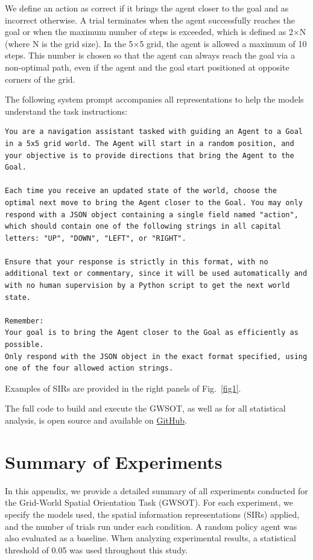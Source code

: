\documentclass[runningheads]{llncs}
\begin{document}
We define an action as correct if it brings the agent closer to the goal and as incorrect otherwise. A trial terminates when the agent successfully reaches the goal or when the maximum number of steps is exceeded, which is defined as 2×N (where N is the grid size). In the 5×5 grid, the agent is allowed a maximum of 10 steps. This number is chosen so that the agent can always reach the goal via a non-optimal path, even if the agent and the goal start positioned at opposite corners of the grid.

The following system prompt accompanies all representations to help the models understand the task instructions: 

\begin{lstlisting}[basicstyle=\ttfamily\small, breaklines=true, frame=single]
You are a navigation assistant tasked with guiding an Agent to a Goal in a 5x5 grid world. The Agent will start in a random position, and your objective is to provide directions that bring the Agent to the Goal.

Each time you receive an updated state of the world, choose the optimal next move to bring the Agent closer to the Goal. You may only respond with a JSON object containing a single field named "action", which should contain one of the following strings in all capital letters: "UP", "DOWN", "LEFT", or "RIGHT".

Ensure that your response is strictly in this format, with no additional text or commentary, since it will be used automatically and with no human supervision by a Python script to get the next world state.

Remember:
Your goal is to bring the Agent closer to the Goal as efficiently as possible.
Only respond with the JSON object in the exact format specified, using one of the four allowed action strings.
\end{lstlisting}

Examples of SIRs are provided in the right panels of Fig.~\ref{fig1}.

The full code to build and execute the GWSOT, as well as for all statistical analysis, is open source and available on \href{https://github.com/mneuronico/Griw-World-Spatial-Orientation-Task}{GitHub}.

\section{Summary of Experiments}

In this appendix, we provide a detailed summary of all experiments conducted for the Grid-World Spatial Orientation Task (GWSOT). For each experiment, we specify the models used, the spatial information representations (SIRs) applied, and the number of trials run under each condition. A random policy agent was also evaluated as a baseline. When analyzing experimental results, a statistical threshold of 0.05 was used throughout this study.
\end{document}
